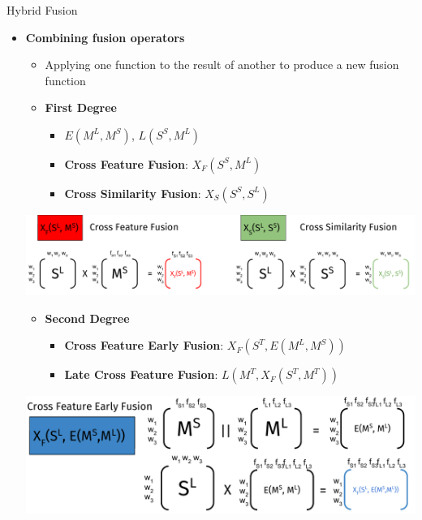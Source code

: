 \documentclass[10pt,=table]{beamer}
\newcommand\mlex{M^{\scriptscriptstyle L}}
\newcommand\msyn{M^{\scriptscriptstyle S}}
\newcommand\ssyn{S^{\scriptscriptstyle S}}
\begin{document}
\begin{frame}{Hybrid Fusion}
\begin{itemize}
\item<1-> \textbf{Combining fusion operators}

\begin{itemize}
\item<1-> Applying one function to the result of another to produce a new fusion function
\end{itemize}
\begin{overprint}
		\begin{itemize}
		\item \textbf{First Degree} 
			\begin{itemize}
			\item $E(\mlex,\msyn)$, $L(\ssyn,\mlex)$ 
			\item \textbf{Cross Feature Fusion}: $X_F(S^S, M^L)$
			\item \textbf{Cross Similarity Fusion}: $X_S(S^S, S^L)$
			\end{itemize}
		\end{itemize}
		\centering
		\includegraphics[width=1\linewidth]{image2/Chapitre2/xFFusion.pdf}
	\onslide<3>
		\begin{itemize}
		\item \textbf{Second Degree} 
			\begin{itemize}
			\item \textbf{Cross Feature Early Fusion}: $X_F(S^T , E(M^L , M^S ))$
			\item \textbf{Late Cross Feature Fusion}: $L(M^T, X_F (S^T , M^T ))$
			\end{itemize}
		\end{itemize}
		\centering
		\includegraphics[width=1\linewidth]{image2/Chapitre2/XFEF.pdf}


\end{overprint}
\end{itemize}
\end{frame}
\end{document}
